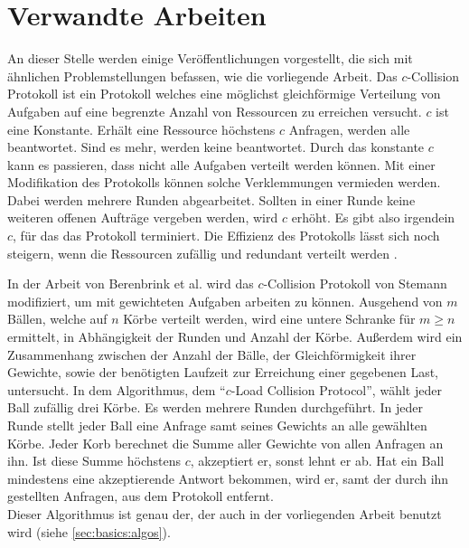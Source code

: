 \chapter{Verwandte Arbeiten}
\label{chap:relwork}
%
An dieser Stelle werden einige Veröffentlichungen vorgestellt, die sich mit ähnlichen Problemstellungen befassen, wie die vorliegende Arbeit.
Das $c$-Collision Protokoll \cite{ccol3} ist ein Protokoll welches eine möglichst gleichförmige Verteilung von Aufgaben auf eine begrenzte Anzahl von Ressourcen zu erreichen versucht. $c$ ist eine Konstante. Erhält eine Ressource höchstens $c$ Anfragen, werden alle beantwortet. Sind es mehr, werden keine beantwortet. Durch das konstante $c$ kann es passieren, dass nicht alle Aufgaben verteilt werden können. Mit einer Modifikation des Protokolls können solche Verklemmungen vermieden werden. Dabei werden mehrere Runden abgearbeitet. Sollten in einer Runde keine weiteren offenen Aufträge vergeben werden, wird $c$ erhöht. Es gibt also irgendein $c$, für das das Protokoll terminiert. Die Effizienz des Protokolls lässt sich noch steigern, wenn die Ressourcen zufällig und redundant verteilt werden \cite{ccol4}.

In der Arbeit von Berenbrink et al. \cite{ccol2} wird das $c$-Collision Protokoll von Stemann \cite{ccol3} modifiziert, um mit gewichteten Aufgaben arbeiten zu können. Ausgehend von $m$ Bällen, welche auf $n$ Körbe verteilt werden, wird eine untere Schranke für $m \ge n$ ermittelt, in Abhängigkeit der Runden und Anzahl der Körbe. Außerdem wird ein Zusammenhang zwischen der Anzahl der Bälle, der Gleichförmigkeit ihrer Gewichte, sowie der benötigten Laufzeit zur Erreichung einer gegebenen Last, untersucht. In dem Algorithmus, dem "`$c$-Load Collision Protocol"', wählt jeder Ball zufällig drei Körbe. Es werden mehrere Runden durchgeführt. In jeder Runde stellt jeder Ball eine Anfrage samt seines Gewichts an alle gewählten Körbe. Jeder Korb berechnet die Summe aller Gewichte von allen Anfragen an ihn. Ist diese Summe höchstens $c$, akzeptiert er, sonst lehnt er ab. Hat ein Ball mindestens eine akzeptierende Antwort bekommen, wird er, samt der durch ihn gestellten Anfragen, aus dem Protokoll entfernt.\\
Dieser Algorithmus ist genau der, der auch in der vorliegenden Arbeit benutzt wird (siehe \ref{sec:basics:algos}).
